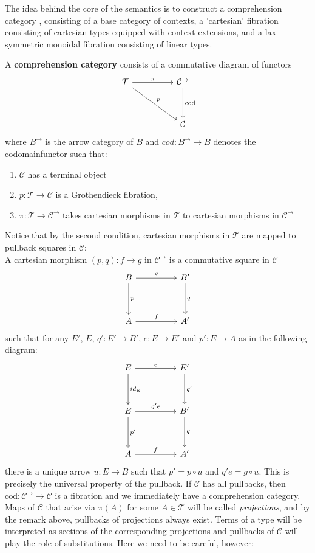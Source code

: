 The idea behind the core of the semantics is to construct a comprehension category \cite{jacobs}, consisting of a base category of contexts, a 'cartesian' fibration consisting of cartesian types equipped with context extensions, and a lax symmetric monoidal fibration consisting of linear types.
\begin{defn}
A \textbf{comprehension category} consists of a commutative diagram of functors
\[
\ti
\mathcal{T} \ar[rd, "p"] \ar[r, "\pi"]  & \mathcal{C}^{\to} \ar[d, "\text{cod}"]\\
& \mathcal{C}
\kz
\]
where $B^\to$ is the arrow category of $B$ and $cod : B^\to \to B$ denotes the codomainfunctor such that:
\begin{enumerate}%
\item $\mathcal{C}$ has a terminal object
\item $p : \mathcal{T} \to \mathcal{C}$ is a Grothendieck fibration,
\item $\pi : \mathcal{T} \to \mathcal{C}^\to$ takes cartesian morphisms in $\mathcal{T}$ to cartesian morphisms in $\mathcal{C}^\to$
\end{enumerate}
Notice that by the second condition, cartesian morphisms in $\mathcal{T}$ are mapped to pullback squares in $\mathcal{C}$:\\
A cartesian morphism $(p, q) : f \to g$ in $\mathcal{C}^\to$ is a commutative square in $\mathcal{C}$
\[
\ti
B \ar[r, "g"] \ar[d, "p"] & B' \ar[d, "q"]\\
A \ar[r,"f"] & A'
\kz
\]
such that for any $E'$, $E$, $q' : E' \to B'$, $e : E \to E'$ and $p' : E \to A$ as in the following diagram:
\[
\ti
E \ar[d, "id_E"] \ar[r, "e"] & E' \ar[d, "q'"] \\
E \ar[d, "p'"] \ar[r, "q'e"] & B' \ar[d,"q"] \\
A \ar[r, "f"] & A'
\kz
\]
there is a unique arrow $u : E \to B$ such that $p' = p \circ u$ and $q'e = g \circ u$. This is precisely the universal property of the pullback.
If $\mathcal{C}$ has all pullbacks, then $\text{cod} : \mathcal{C}^\to \to \mathcal{C}$ is a fibration and we immediately have a comprehension category.
Maps of $\mathcal{C}$ that arise via $\pi(A)$ for some $A \in \mathcal{T}$ will be called \textit{projections}, and by the remark above, pullbacks of projections always exist. Terms of a type will be interpreted as sections of the corresponding projections and pullbacks of $\mathcal{C}$ will play the role of substitutions. Here we need to be careful, however:
\end{defn}
